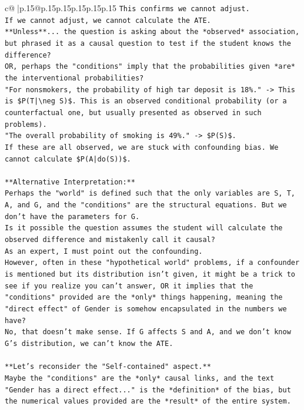 \documentclass{article}
\begin{document}
{\begin{supertabular}{c@{$\;$}|p{.15\linewidth}@{}p{.15\linewidth}p{.15\linewidth}p{.15\linewidth}p{.15\linewidth}p{.15\linewidth}}
{{{\texttt{This confirms we cannot adjust.} \\
\texttt{If we cannot adjust, we cannot calculate the ATE.} \\
\texttt{**Unless**... the question is asking about the *observed* association, but phrased it as a causal question to test if the student knows the difference?} \\
\texttt{OR, perhaps the "conditions" imply that the probabilities given *are* the interventional probabilities?} \\
\texttt{"For nonsmokers, the probability of high tar deposit is 18\%." {-}> This is \$P(T|\textbackslash{}neg S)\$. This is an observed conditional probability (or a counterfactual one, but usually presented as observed in such problems).} \\
\texttt{"The overall probability of smoking is 49\%." {-}> \$P(S)\$.} \\
\texttt{If these are all observed, we are stuck with confounding bias. We cannot calculate \$P(A|do(S))\$.} \\
\\ 
\texttt{**Alternative Interpretation:**} \\
\texttt{Perhaps the "world" is defined such that the only variables are S, T, A, and G, and the "conditions" are the structural equations. But we don't have the parameters for G.} \\
\texttt{Is it possible the question assumes the student will calculate the observed difference and mistakenly call it causal?} \\
\texttt{As an expert, I must point out the confounding.} \\
\texttt{However, often in these "hypothetical world" problems, if a confounder is mentioned but its distribution isn't given, it might be a trick to see if you realize you can't answer, OR it implies that the "conditions" provided are the *only* things happening, meaning the "direct effect" of Gender is somehow encapsulated in the numbers we have?} \\
\texttt{No, that doesn't make sense. If G affects S and A, and we don't know G's distribution, we can't know the ATE.} \\
\\ 
\texttt{**Let's reconsider the "Self{-}contained" aspect.**} \\
\texttt{Maybe the "conditions" are the *only* causal links, and the text "Gender has a direct effect..." is the *definition* of the bias, but the numerical values provided are the *result* of the entire system.} \\
}}}
\end{supertabular}}
\end{document}
